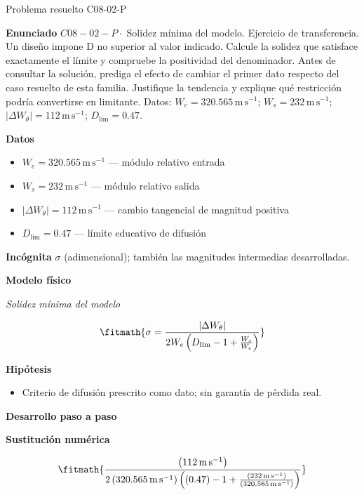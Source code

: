 \documentclass[10pt,openany]{book}
\begin{document}
\begin{studiumworked}{Problema resuelto C08-02-P}


\noindent\textbf{Enunciado}
\(C08-02-P \cdot\) Solidez mínima del modelo. Ejercicio de transferencia. Un diseño impone D no superior al valor indicado. Calcule la solidez que satisface exactamente el límite y compruebe la positividad del denominador. Antes de consultar la solución, prediga el efecto de cambiar el primer dato respecto del caso resuelto de esta familia. Justifique la tendencia y explique qué restricción podría convertirse en limitante. Datos: \(W_e=320.565\, \mathrm{m}\,\mathrm{s}^{-1}\); \(W_s=232\, \mathrm{m}\,\mathrm{s}^{-1}\); \(|\Delta W_\theta|=112\, \mathrm{m}\,\mathrm{s}^{-1}\); \(D_{\mathrm{lim}}=0.47\).

\noindent\textbf{Datos}
\begin{itemize}
\item $W_e = 320.565\,\mathrm{m}\,\mathrm{s}^{-1}$ — módulo relativo entrada
\item $W_s = 232\,\mathrm{m}\,\mathrm{s}^{-1}$ — módulo relativo salida
\item $|\Delta W_\theta| = 112\,\mathrm{m}\,\mathrm{s}^{-1}$ — cambio tangencial de magnitud positiva
\item $D_{\mathrm{lim}} = 0.47$ — límite educativo de difusión
\end{itemize}

\noindent\textbf{Incógnita}
$\sigma$ (adimensional); también las magnitudes intermedias desarrolladas.

\noindent\textbf{Modelo físico}

\noindent\textit{Solidez mínima del modelo}

\[
\fitmath{\sigma=\frac{|\Delta W_\theta|}{2 W_e \left(D_{\mathrm{lim}} - 1 + \frac{W_s}{W_e}\right)}}
\]

\noindent\textbf{Hipótesis}
\begin{itemize}
\item Criterio de difusión prescrito como dato; sin garantía de pérdida real.
\end{itemize}

\noindent\textbf{Desarrollo paso a paso}



\noindent\textbf{Sustitución numérica}

\[
\fitmath{\frac{\left(112\,\mathrm{m}\,\mathrm{s}^{-1}\right)}{2 \left(320.565\,\mathrm{m}\,\mathrm{s}^{-1}\right) \left(\left(0.47\right) - 1 + \frac{\left(232\,\mathrm{m}\,\mathrm{s}^{-1}\right)}{\left(320.565\,\mathrm{m}\,\mathrm{s}^{-1}\right)}\right)}}
\]


\end{studiumworked}
\end{document}
